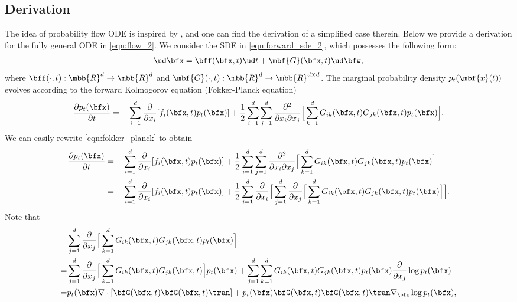 \subsection{Derivation}\label{app:prob_flow_derive}
The idea of probability flow ODE is inspired by \citet{maoutsa2020interacting}, and one can find the derivation of a simplified case therein. Below we provide a derivation for the fully general ODE in \cref{eqn:flow_2}. We consider the SDE in \cref{eqn:forward_sde_2}, which possesses the following form:
\begin{align*}
    \ud \bfx = \bff(\bfx, t) \ud t + \mbf{G}(\bfx, t) \ud \bfw,
\end{align*}
where $\bff(\cdot, t): \mbb{R}^d \to \mbb{R}^d$ and $\mbf{G}(\cdot, t): \mbb{R}^d \to \mbb{R}^{d\times d}$. The marginal probability density $p_t(\mbf{x}(t))$ evolves according to the forward Kolmogorov equation (Fokker-Planck equation)~\citep{oksendal2003stochastic}
\begin{align}
    \frac{\partial p_t(\bfx)}{\partial t} = -\sum_{i=1}^d \frac{\partial}{\partial x_i}[f_i(\bfx, t) p_t(\bfx)] + \frac{1}{2}\sum_{i=1}^d\sum_{j=1}^d \frac{\partial^2}{\partial x_i \partial x_j}\Big[\sum_{k=1}^d G_{ik}(\bfx, t) G_{jk}(\bfx, t) p_t(\bfx)\Big] \label{eqn:fokker_planck}.
\end{align}
We can easily rewrite \cref{eqn:fokker_planck} to obtain
\begin{align}
    \frac{\partial p_t(\bfx)}{\partial t} &= -\sum_{i=1}^d \frac{\partial}{\partial x_i}[f_i(\bfx, t) p_t(\bfx)] + \frac{1}{2}\sum_{i=1}^d\sum_{j=1}^d \frac{\partial^2}{\partial x_i \partial x_j}\Big[\sum_{k=1}^d G_{ik}(\bfx, t) G_{jk}(\bfx, t) p_t(\bfx)\Big]\notag \\
    &= -\sum_{i=1}^d \frac{\partial}{\partial x_i}[f_i(\bfx, t) p_t(\bfx)] + \frac{1}{2}\sum_{i=1}^d \frac{\partial}{\partial x_i} \Big[ \sum_{j=1}^d \frac{\partial}{\partial x_j}\Big[\sum_{k=1}^d G_{ik}(\bfx, t) G_{jk}(\bfx, t) p_t(\bfx)\Big]\Big]. \label{eqn:ode_part_1}
\end{align}
Note that
\begin{align*}
    &\sum_{j=1}^d \frac{\partial}{\partial x_j}\Big[\sum_{k=1}^d G_{ik}(\bfx, t) G_{jk}(\bfx, t) p_t(\bfx)\Big]\\
    =& \sum_{j=1}^d \frac{\partial}{\partial x_j} \Big[ \sum_{k=1}^d G_{ik}(\bfx, t) G_{jk}(\bfx, t) \Big] p_t(\bfx) + \sum_{j=1}^d \sum_{k=1}^d G_{ik}(\bfx, t)G_{jk}(\bfx, t) p_t(\bfx) \frac{\partial}{\partial x_j} \log p_t(\bfx)\\
    =& p_t(\bfx) \nabla \cdot [\bfG(\bfx, t)\bfG(\bfx, t)\tran] + p_t(\bfx) \bfG(\bfx, t)\bfG(\bfx, t)\tran \nabla_\bfx \log p_t(\bfx),
\end{align*}
